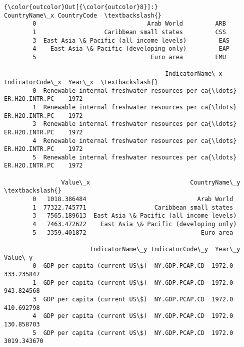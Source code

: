 \documentclass[11pt]{article}
\begin{document}
\begin{Verbatim}[commandchars=\\\{\}]
{\color{outcolor}Out[{\color{outcolor}8}]:}                              CountryName\_x CountryCode  \textbackslash{}
        0                               Arab World         ARB   
        1                   Caribbean small states         CSS   
        3  East Asia \& Pacific (all income levels)         EAS   
        4    East Asia \& Pacific (developing only)         EAP   
        5                                Euro area         EMU   
        
                                             IndicatorName\_x IndicatorCode\_x  Year\_x  \textbackslash{}
        0  Renewable internal freshwater resources per ca{\ldots}  ER.H2O.INTR.PC    1972   
        1  Renewable internal freshwater resources per ca{\ldots}  ER.H2O.INTR.PC    1972   
        3  Renewable internal freshwater resources per ca{\ldots}  ER.H2O.INTR.PC    1972   
        4  Renewable internal freshwater resources per ca{\ldots}  ER.H2O.INTR.PC    1972   
        5  Renewable internal freshwater resources per ca{\ldots}  ER.H2O.INTR.PC    1972   
        
                Value\_x                            CountryName\_y  \textbackslash{}
        0   1018.386484                               Arab World   
        1  77322.745771                   Caribbean small states   
        3   7565.189613  East Asia \& Pacific (all income levels)   
        4   7463.472622    East Asia \& Pacific (developing only)   
        5   3359.401872                                Euro area   
        
                        IndicatorName\_y IndicatorCode\_y  Year\_y      Value\_y  
        0  GDP per capita (current US\$)  NY.GDP.PCAP.CD  1972.0   333.235847  
        1  GDP per capita (current US\$)  NY.GDP.PCAP.CD  1972.0   943.824568  
        3  GDP per capita (current US\$)  NY.GDP.PCAP.CD  1972.0   410.692798  
        4  GDP per capita (current US\$)  NY.GDP.PCAP.CD  1972.0   130.858703  
        5  GDP per capita (current US\$)  NY.GDP.PCAP.CD  1972.0  3019.343670  
\end{Verbatim}
            
\end{document}
